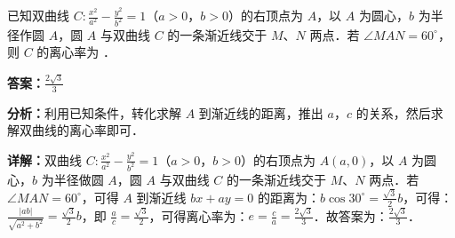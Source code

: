 \begin{question}[points=5]
已知双曲线 $C:\frac{x^2}{a^2}-\frac{y^2}{b^2}=1$（$a>0$，$b>0$）的右顶点为 $A$，以 $A$ 为圆心，$b$ 为半径作圆 $A$，圆 $A$ 与双曲线 $C$ 的一条渐近线交于 $M$、$N$ 两点．若 $\angle MAN=60^\circ$，则 $C$ 的离心率为 ．
\begin{solution}
\textbf{答案：}$\frac{2\sqrt{3}}{3}$

\textbf{分析：}利用已知条件，转化求解 $A$ 到渐近线的距离，推出 $a$，$c$ 的关系，然后求解双曲线的离心率即可．

\textbf{详解：}双曲线 $C:\frac{x^2}{a^2}-\frac{y^2}{b^2}=1$（$a>0$，$b>0$）的右顶点为 $A(a,0)$，以 $A$ 为圆心，$b$ 为半径做圆 $A$，圆 $A$ 与双曲线 $C$ 的一条渐近线交于 $M$、$N$ 两点．若 $\angle MAN=60^\circ$，可得 $A$ 到渐近线 $bx+ay=0$ 的距离为：$b\cos30^\circ=\frac{\sqrt{3}}{2}b$，可得：$\frac{|ab|}{\sqrt{a^2+b^2}}=\frac{\sqrt{3}}{2}b$，即 $\frac{a}{c}=\frac{\sqrt{3}}{2}$，可得离心率为：$e=\frac{c}{a}=\frac{2\sqrt{3}}{3}$．故答案为：$\frac{2\sqrt{3}}{3}$．
\end{solution}
\end{question}

